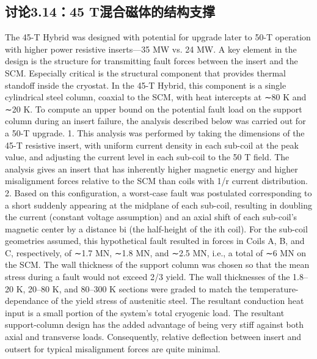\subsection{讨论3.14：45 T混合磁体的结构支撑}
The 45-T Hybrid was designed with potential for upgrade later to 50-T operation
with higher power resistive inserts—35 MW vs. 24 MW. A key element in the
design is the structure for transmitting fault forces between the insert and the
SCM. Especially critical is the structural component that provides thermal standoff inside the cryostat. In the 45-T Hybrid, this component is a single cylindrical
steel column, coaxial to the SCM, with heat intercepts at ∼80 K and ∼20 K. To
compute an upper bound on the potential fault load on the support column during
an insert failure, the analysis described below was carried out for a 50-T upgrade.
1. This analysis was performed by taking the dimensions of the 45-T resistive
insert, with uniform current density in each sub-coil at the peak value, and
adjusting the current level in each sub-coil to the 50 T field. The analysis gives
an insert that has inherently higher magnetic energy and higher misalignment
forces relative to the SCM than coils with 1/r current distribution.
2. Based on this configuration, a worst-case fault was postulated corresponding
to a short suddenly appearing at the midplane of each sub-coil, resulting in
doubling the current (constant voltage assumption) and an axial shift of each
sub-coil’s magnetic center by a distance bi (the half-height of the ith coil). For
the sub-coil geometries assumed, this hypothetical fault resulted in forces in
Coils A, B, and C, respectively, of ∼1.7 MN, ∼1.8 MN, and ∼2.5 MN, i.e., a
total of ∼6 MN on the SCM. The wall thickness of the support column was
chosen so that the mean stress during a fault would not exceed 2/3 yield. The
wall thicknesses of the 1.8–20 K, 20–80 K, and 80–300 K sections were graded
to match the temperature-dependance of the yield stress of austenitic steel.
The resultant conduction heat input is a small portion of the system’s total
cryogenic load. The resultant support-column design has the added advantage
of being very stiff against both axial and transverse loads. Consequently,
relative deflection between insert and outsert for typical misalignment forces
are quite minimal.
\newpage



